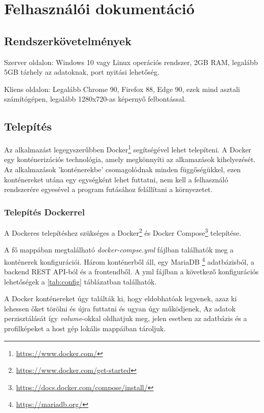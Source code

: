 \chapter{Felhasználói dokumentáció} %
\label{ch:user}

\section{Rendszerkövetelmények}
Szerver oldalon: Windows 10 vagy Linux operációs rendszer, 2GB RAM, legalább 5GB tárhely az adatoknak, port nyitási lehetőség.

Kliens oldalon: Legalább Chrome 90, Firefox 88, Edge 90, ezek mind asztali számítógépen, legalább 1280x720-as képernyő felbontással.

\section{Telepítés}

Az alkalmazást legegyszerűbben Docker\footnote{\url{https://www.docker.com/}} segítségével lehet telepíteni. A Docker egy konténerizációs technológia, amely megkönnyíti az alkamazások kihelyezését. Az alkalmazások 'konténerekbe' csomagolódnak minden függőségükkel, ezen konténereket utána egy egységként lehet futtatni, nem kell a felhasználó rendszerére egyesével a program futásához felállítani a környezetet.

\subsection{Telepítés Dockerrel}

A Dockeres telepítéshez szükséges a Docker\footnote{\url{https://www.docker.com/get-started}} és Docker Compose\footnote{\url{https://docs.docker.com/compose/install/}} telepítése.

A fő mappában megtalálható \textit{docker-compse.yml} fájlban találhatók meg a konténerek konfigurációi. Három konténerből áll, egy MariaDB \footnote{\url{https://mariadb.org/}} adatbázisból, a backend REST API-ból és a frontendből.
A yml fájlban a következő konfigurációs lehetőségek a \ref{tab:config} táblázatban találhatók.

A Docker konténereket úgy találták ki, hogy eldobhatóak legyenek, azaz ki lehessen őket törölni és újra futtatni és ugyan úgy működjenek, Az adatok perzisztálását így \textit{volume}-okkal oldhatjuk meg, jelen esetben az adatbázis és a profilképeket a host gép lokális mappáiban tároljuk.

